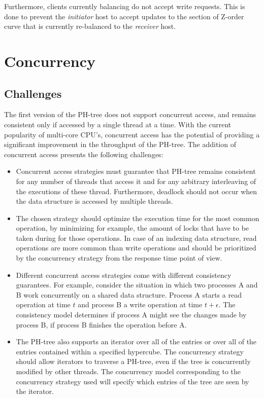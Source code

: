\documentclass[11pt,a4paper]{globis-book}
\begin{document}
Furthermore, clients currently balancing do not accept write requests. This is done to prevent the \textit{initiator} host to accept updates to the section of Z-order curve that is currently re-balanced to the \textit{receiver} host.

\chapter{Concurrency}
\label{ch:concurrency}

\section{Challenges}
The first version of the PH-tree does not support concurrent access, and remains consistent only if accessed by a single thread at a time. With the current popularity of multi-core CPU's, concurrent access has the potential of providing a significant improvement in the throughput of the PH-tree. The addition of concurrent access presents the following challenges:
\begin{itemize}
    \item Concurrent access strategies must guarantee that PH-tree remains consistent for any number of threads that access it and for any arbitrary interleaving of the executions of these thread. Furthermore, deadlock should not occur when the data structure is accessed by multiple threads.
    \item The chosen strategy should optimize the execution time for the most common operation, by minimizing for example, the amount of locks that have to be taken during for those operations. In case of an indexing data structure, read operations are more common than write operations and should be prioritized by the concurrency strategy from the response time point of view.
    \item Different concurrent access strategies come with different consistency guarantees. For example, consider the situation in which two processes A and B work concurrently on a shared data structure. Process A starts a read operation at time $t$ and process B a write operation at time $t + \epsilon$. The consistency model determines if process A might see the changes made by process B, if process B finishes the operation before A.
    \item The PH-tree also supports an iterator over all of the entries or over all of the entries contained within a specified hypercube. The concurrency strategy should allow iterators to traverse a PH-tree, even if the tree is concurrently modified by other threads. The concurrency model corresponding to the concurrency strategy used will specify which entries of the tree are seen by the iterator.
\end{itemize}
\end{document}
